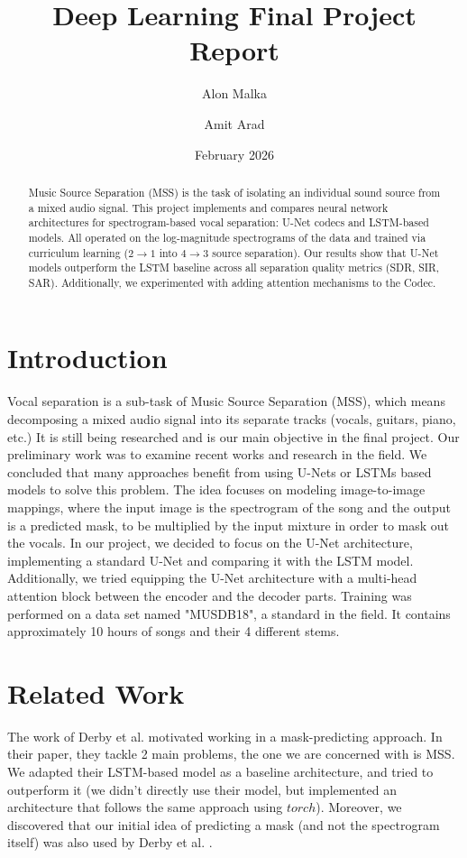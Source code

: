 \documentclass{article}
\title{Deep Learning Final Project Report}
\author{Alon Malka \and Amit Arad }
\date{February 2026}
\begin{document}
\maketitle

\begin{abstract}
Music Source Separation (MSS) is the task of isolating an individual sound source from a mixed audio signal. This project implements and compares neural network architectures for spectrogram-based vocal separation: U-Net codecs and LSTM-based models. All operated on the log-magnitude spectrograms of the data and trained via curriculum learning ($2 \rightarrow 1$ into $4 \rightarrow 3$ source separation). Our results show that U-Net models outperform the LSTM baseline across all separation quality metrics (SDR, SIR, SAR). Additionally, we experimented with adding attention mechanisms to the Codec.
\end{abstract}


\section{Introduction}
Vocal separation is a sub-task of Music Source Separation (MSS), which means decomposing a mixed audio signal into its separate tracks (vocals, guitars, piano, etc.) It is still being researched and is our main objective in the final project.
Our preliminary work was to examine recent works and research in the field. We concluded that many approaches benefit from using U-Nets or LSTMs based models to solve this problem. The idea focuses on modeling image-to-image mappings, where the input image is the spectrogram of the song and the output is a predicted mask, to be multiplied by the input mixture in order to mask out the vocals. In our project, we decided to focus on the U-Net architecture, implementing a standard U-Net and comparing it with the LSTM model. Additionally, we tried equipping the U-Net architecture with a multi-head attention block between the encoder and the decoder parts.
Training was performed on a data set named "MUSDB18", a standard in the field. It contains approximately 10 hours of songs and their 4 different stems.

\section{Related Work}
The work of Derby et al. \cite{derby2024source} motivated working in a mask-predicting approach. In their paper, they tackle 2 main problems, the one we are concerned with is MSS. We adapted their LSTM-based model as a baseline architecture, and tried to outperform it (we didn't directly use their model, but implemented an architecture that follows the same approach using $torch$). Moreover, we discovered that our initial idea of predicting a mask (and not the spectrogram itself) was also used by Derby et al. \cite{derby2024source}. 
\end{document}
